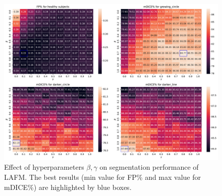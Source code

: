 \begin{figure}[htbp]
    \centering
    \includegraphics[width=\linewidth]{figures/mdice-beta-gamma.pdf}
    \caption[Effect of hyperparameters $\beta, \gamma$ on segmentation performance of LAFM.]{Effect of hyperparameters $\beta, \gamma$ on segmentation performance of LAFM. The best results (min value for FP\% and max value for mDICE\%) are highlighted by blue boxes.}
    \label{fig:mdice-beta-gamma}
\end{figure}